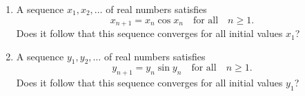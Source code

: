 \documentclass{article}
\begin{document}
\setlength{\parindent}{0pt}
\begin{enumerate}[label=(\alph*)]
\item A sequence $x_{1},x_{2},\dots$ of real numbers satisfies$$x_{n+1}=x_{n}\cos x_{n}\quad\text{for all}\quad n\ge1.$$Does it follow that this sequence converges for all initial values $x_{1}$?
\item A sequence $y_{1},y_{2},\dots$ of real numbers satisfies$$y_{n+1}=y_{n}\sin y_{n}\quad\text{for all}\quad n\ge1.$$Does it follow that this sequence converges for all initial values $y_{1}$?
\end{enumerate}
\end{document}
